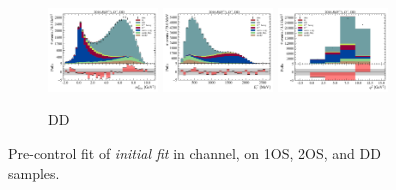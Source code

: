 \begin{figure}[htb]
    \begin{subfigure}{\textwidth}
        \includegraphics[width=0.32\textwidth]{./figs-supplemental-plots/init-fit/pre-ctrl/fit_result-stacked-Dst-dd-mmiss2.pdf}
        \includegraphics[width=0.32\textwidth]{./figs-supplemental-plots/init-fit/pre-ctrl/fit_result-stacked-Dst-dd-el.pdf}
        \includegraphics[width=0.32\textwidth]{./figs-supplemental-plots/init-fit/pre-ctrl/fit_result-stacked-Dst-dd-q2.pdf}
        \caption{DD}
    \end{subfigure}
    \caption{
        Pre-control fit of \emph{initial fit} in \Dstar channel,
        on 1OS, 2OS, and DD samples.
    }
    \label{fig:init-fit-pre-ctrl-dst}
\end{figure}

